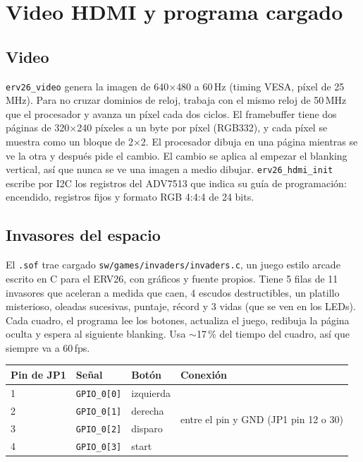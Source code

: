 \documentclass[11pt,a4paper]{article}
\newcommand{\code}[1]{\texttt{#1}}
\begin{document}
\section{Video HDMI y programa cargado}

\subsection{Video}

\code{erv26\_video} genera la imagen de 640$\times$480 a 60\,Hz (timing VESA, píxel de 25\,MHz). Para no cruzar dominios de reloj, trabaja con el mismo reloj de 50\,MHz que el procesador y avanza un píxel cada dos ciclos. El framebuffer tiene dos páginas de 320$\times$240 píxeles a un byte por píxel (RGB332), y cada píxel se muestra como un bloque de 2$\times$2. El procesador dibuja en una página mientras se ve la otra y después pide el cambio. El cambio se aplica al empezar el blanking vertical, así que nunca se ve una imagen a medio dibujar. \code{erv26\_hdmi\_init} escribe por I2C los registros del ADV7513 que indica su guía de programación: encendido, registros fijos y formato RGB 4:4:4 de 24 bits.

\subsection{Invasores del espacio}

El \code{.sof} trae cargado \code{sw/games/invaders/invaders.c}, un juego estilo arcade escrito en C para el ERV26, con gráficos y fuente propios. Tiene 5 filas de 11 invasores que aceleran a medida que caen, 4 escudos destructibles, un platillo misterioso, oleadas sucesivas, puntaje, récord y 3 vidas (que se ven en los LEDs). Cada cuadro, el programa lee los botones, actualiza el juego, redibuja la página oculta y espera al siguiente blanking. Usa $\sim$17\,\% del tiempo del cuadro, así que siempre va a 60\,fps.

\begin{center}
\begin{tabular}{llll}
\toprule
Pin de JP1 & Señal & Botón & Conexión \\
\midrule
1 & \code{GPIO\_0[0]} & izquierda & \multirow{4}{*}{entre el pin y GND (JP1 pin 12 o 30)} \\
2 & \code{GPIO\_0[1]} & derecha & \\
3 & \code{GPIO\_0[2]} & disparo & \\
4 & \code{GPIO\_0[3]} & start & \\
\bottomrule
\end{tabular}
\end{center}
\end{document}
